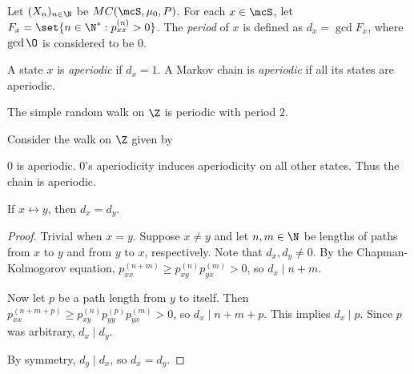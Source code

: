 \begin{definition*}[Period] \label{def:period}
    Let $(X_n)_{n \in \N}$ be $MC(\mcS, \mu_0, P)$.
    For each $x \in \mcS$, let $F_x = \set{n \in \N^* : p_{xx}^{(n)} > 0}$.
    The \emph{period} of $x$ is defined as $d_x = \gcd F_x$, where
    $\gcd \O$ is considered to be $0$.

    A state $x$ is \emph{aperiodic} if $d_x = 1$.
    A Markov chain is \emph{aperiodic} if all its states are aperiodic.
\end{definition*}
\begin{examples}
    \item The simple random walk on $\Z$ is periodic with period $2$.
    \item Consider the walk on $\Z$ given by
    \begin{center}
    \end{center}
    $0$ is aperiodic.
    $0$'s aperiodicity induces aperiodicity on all other states.
    Thus the chain is aperiodic.
\end{examples}
\begin{theorem}
    If $x \leftrightarrow y$, then $d_x = d_y$.
\end{theorem}
\begin{proof}
    Trivial when $x = y$.
    Suppose $x \ne y$ and let $n, m \in \N$ be lengths of paths from
    $x$ to $y$ and from $y$ to $x$, respectively.
    Note that $d_x, d_y \ne 0$.
    By the Chapman-Kolmogorov equation,
    $p_{xx}^{(n+m)} \ge p_{xy}^{(n)} p_{yx}^{(m)} > 0$, so $d_x \mid n + m$.

    Now let $p$ be a path length from $y$ to itself.
    Then $p_{xx}^{(n + m + p)} \ge p_{xy}^{(n)} p_{yy}^{(p)} p_{yx}^{(m)}
    > 0$, so $d_x \mid n + m + p$.
    This implies $d_x \mid p$.
    Since $p$ was arbitrary, $d_x \mid d_y$.

    By symmetry, $d_y \mid d_x$, so $d_x = d_y$.
\end{proof}

